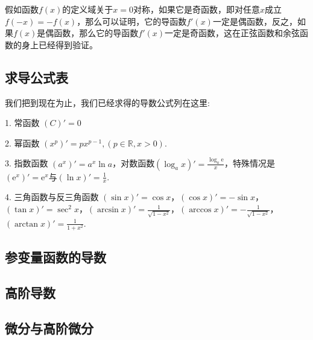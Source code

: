 \begin{example}
  假如函数$f(x)$的定义域关于$x=0$对称，如果它是奇函数，即对任意$x$成立$f(-x)=-f(x)$，那么可以证明，它的导函数$f'(x)$一定是偶函数，反之，如果$f(x)$是偶函数，那么它的导函数$f'(x)$一定是奇函数，这在正弦函数和余弦函数的身上已经得到验证。
\end{example}

\subsection{求导公式表}
\label{sec:table-of-derivative-formule}

我们把到现在为止，我们已经求得的导数公式列在这里:

1. 常函数 $(C)' = 0$

2. 幂函数 $(x^p)' = p x^{p-1}, (p \in \mathbb{R},x>0)$.

3. 指数函数 $(a^x)' = a^x \ln{a}$，对数函数$(\log_a x)' = \frac{\log_a \mathrm{e}}{x}$，特殊情况是 $(\mathrm{e}^x)' = \mathrm{e}^x$与$(\ln{x})'=\frac{1}{x}$.

4. 三角函数与反三角函数 $(\sin{x})' = \cos{x}$，$(\cos{x})'=-\sin{x}$，$(\tan{x})'=\sec^2{x}$，$(\arcsin{x})' = \frac{1}{\sqrt{1-x^2}}$，$(\arccos{x})'= - \frac{1}{\sqrt{1-x^2}}$，$(\arctan{x})' = \frac{1}{1+x^2}$.

\subsection{参变量函数的导数}
\label{sec:derivative-of-parametered-function}

\subsection{高阶导数}
\label{sec:high-level-derivative}

\subsection{微分与高阶微分}
\label{sec:difference-and-high-level-difference}



